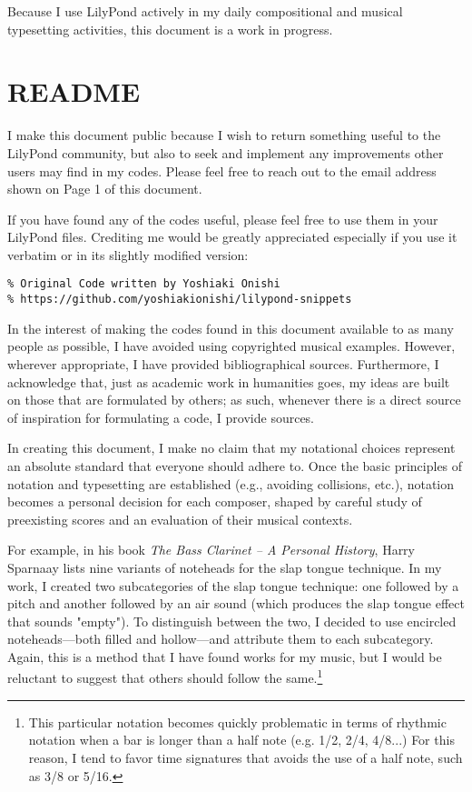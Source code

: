\documentclass[11pt, oneside]{book}   	%
\begin{document}
Because I use LilyPond actively in my daily compositional and musical typesetting activities, this document is a work in progress. 

\section{README}

I make this document public because I wish to return something useful to the LilyPond community, but also to seek and implement any improvements other users may find in my codes. Please feel free to reach out to the email address shown on Page 1 of this document.

If you have found any of the codes useful, please feel free to use them in your LilyPond files. Crediting me would be greatly appreciated especially if you use it verbatim or in its slightly modified version:

\begin{verbatim}
% Original Code written by Yoshiaki Onishi
% https://github.com/yoshiakionishi/lilypond-snippets
\end{verbatim}

In the interest of making the codes found in this document available to as many people as possible, I have avoided using copyrighted musical examples. However, wherever appropriate, I have provided bibliographical sources. Furthermore, I acknowledge that, just as academic work in humanities goes, my ideas are built on those that are formulated by others; as such, whenever there is a direct source of inspiration for formulating a code, I provide sources. 

In creating this document, I make no claim that my notational choices represent an absolute standard that everyone should adhere to. Once the basic principles of notation and typesetting are established (e.g., avoiding collisions, etc.), notation becomes a personal decision for each composer, shaped by careful study of preexisting scores and an evaluation of their musical contexts. 

For example, in his book \textit{The Bass Clarinet – A Personal History}, Harry Sparnaay lists nine variants of noteheads for the slap tongue technique.\autocite[66]{HS2012} In my work, I created two subcategories of the slap tongue technique: one followed by a pitch and another followed by an air sound (which produces the slap tongue effect that sounds "empty"). To distinguish between the two, I decided to use encircled noteheads—both filled and hollow—and attribute them to each subcategory. Again, this is a method that I have found works for my music, but I would be reluctant to suggest that others should follow the same.\footnote{This particular notation becomes quickly problematic in terms of rhythmic notation when a bar is longer than a half note (e.g. 1/2, 2/4, 4/8...) For this reason, I tend to favor time signatures that avoids the use of a half note, such as 3/8 or 5/16.} 
\end{document}
